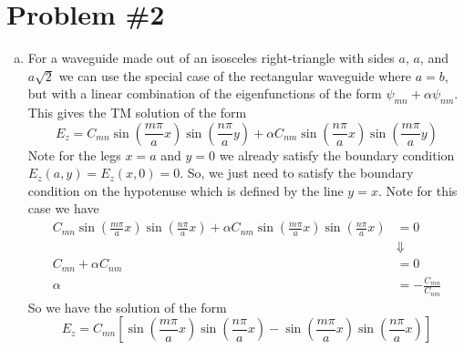 \documentclass[11pt]{article}
\numberwithin{equation}{section}
\begin{document}
\section{Problem \#2}
\begin{enumerate}[(a)]
\item
    For a waveguide made out of an isosceles right-triangle with sides $a$, $a$, and $a\sqrt{2}$ we can use the 
    special case of the rectangular waveguide where $a=b$, but with a linear combination of the eigenfunctions
    of the form $\psi_{mn} + \alpha\psi_{nm}$. This gives the TM solution of the form
    $$E_z = C_{mn}\sin\left(\frac{m\pi}{a}x\right)\sin\left(\frac{n\pi}{a}y\right) + \alpha C_{nm}\sin\left(\frac{n\pi}{a}x\right)\sin\left(\frac{m\pi}{a}y\right)$$
    Note for the legs $x=a$ and $y=0$ we already satisfy the boundary condition $E_z(a,y)=E_z(x,0)=0$. So, we just need
    to satisfy the boundary condition on the hypotenuse which is defined by the line $y=x$. Note for this case we
    have
    \begin{align*}
        C_{mn}\sin\left(\frac{m\pi}{a}x\right)\sin\left(\frac{n\pi}{a}x\right) + \alpha C_{nm}\sin\left(\frac{m\pi}{a}x\right)\sin\left(\frac{n\pi}{a}x\right) &= 0\\
                                                                                                                                                               &\Downarrow\\
        C_{mn} + \alpha C_{nm} &= 0\\
        \alpha &= -\frac{C_{mn}}{C_{nm}}
    \end{align*}
    So we have the solution of the form 
    $$E_z = C_{mn}\left[\sin\left(\frac{m\pi}{a}x\right)\sin\left(\frac{n\pi}{a}x\right) - \sin\left(\frac{m\pi}{a}x\right)\sin\left(\frac{n\pi}{a}x\right)\right]$$


\end{enumerate}
\end{document}
